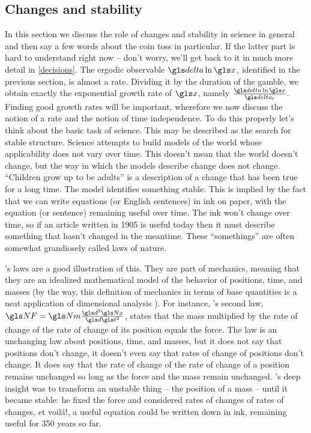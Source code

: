 \subsection{Changes and stability}
In this section we discuss the role of changes and stability in science in general and then say a few words about the coin toss in particular. 
If the latter part is hard to understand right now -- don't worry, we'll get back to it in much more detail in \cref{decisions}.
The ergodic observable $\d \ln \x$, identified in the previous section, is almost a rate.
Dividing it by the duration of the gamble, we obtain exactly the exponential 
growth rate of $\x$, namely $\frac{\d \ln \x}{\dt}$. Finding good growth rates 
will be important, wherefore we now discuss the notion of a rate and 
the notion of time independence. 
To do this properly let's think about the basic task of science. This may be described as the 
search for stable structure. Science attempts to build models of the world 
whose applicability does not vary over time. This doesn't mean that the world doesn't change, 
but the way in which the models describe change does not change. ``Children grow up to be adults'' is a 
description of a change that has been true for a long time. The model identifies
something stable. This is implied by the fact that we can write 
equations (or English sentences) in ink on paper, with the equation (or sentence) remaining 
useful over time. The ink won't change over time, so
if an article written in 1905 is useful today then it must describe something that hasn't 
changed in the meantime. These ``somethings'' are often somewhat 
grandiosely called laws of nature.

's laws are a good illustration of this. They are part of mechanics, meaning that they
are an idealized mathematical model of the behavior of positions, time, and masses (by the way, this definition of 
mechanics in terms of base quantities is a neat application of dimensional analysis \cite{Barenblatt2003}). 
For instance, 's second law, $\NF=\Nm \frac{\gd^2 \Nx}{\gd\t^2}$, states that the mass multiplied by 
the rate of change of the rate of change of its position equals the force. The law is an unchanging 
law about positions, time, and masses, but it does not say that positions don't change, it doesn't even say 
that rates of change of positions don't change. It does say that the rate of change of the 
rate of change of a position remains unchanged so long as the force and the mass 
remain unchanged. 's deep insight was to transform an unstable thing -- the position of a mass --
until it became stable: he fixed the force and considered rates of changes of rates of changes, et 
voil\'a!, a useful equation could be written down in ink, remaining useful for 350 years so far.

